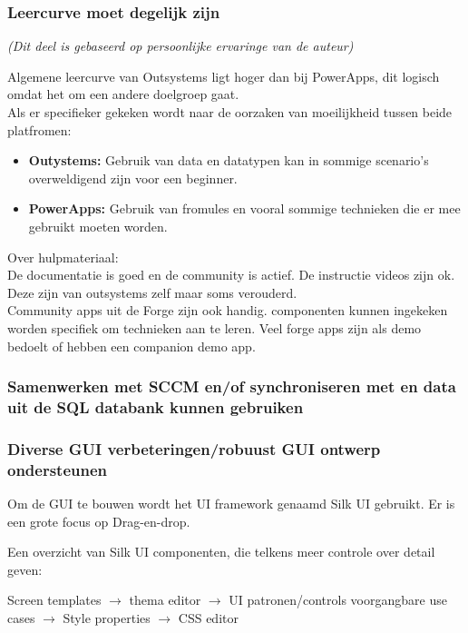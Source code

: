 \subsubsection{Leercurve moet degelijk zijn}

\textit{(Dit deel is gebaseerd op persoonlijke ervaringe van de auteur)}

Algemene leercurve van Outsystems ligt hoger dan bij PowerApps, dit logisch omdat het om een andere doelgroep gaat.\\
Als er specifieker gekeken wordt naar de oorzaken van moeilijkheid tussen beide platfromen:
\begin{itemize}
    \item \textbf{Outystems:} Gebruik van data en datatypen kan in sommige scenario's overweldigend zijn voor een beginner.
    \item \textbf{PowerApps:} Gebruik van fromules en vooral sommige technieken die er mee gebruikt moeten worden.
\end{itemize}

Over hulpmateriaal:\\
De documentatie is goed en de community is actief. De instructie videos zijn ok. Deze zijn van outsystems zelf maar soms verouderd.\\
Community apps uit de Forge zijn ook handig. componenten kunnen ingekeken worden specifiek om technieken aan te leren. Veel forge apps zijn als demo bedoelt of hebben een companion demo app.

\subsubsection{Samenwerken met SCCM en/of synchroniseren met en data uit de SQL databank kunnen gebruiken}


\subsubsection{Diverse GUI verbeteringen/robuust GUI ontwerp ondersteunen}

Om de GUI te bouwen wordt het UI framework genaamd Silk UI gebruikt. Er is een grote focus op Drag-en-drop.

Een overzicht van Silk UI componenten, die telkens meer controle over detail geven:

Screen templates $\rightarrow$ thema editor $\rightarrow$ UI patronen/controls voorgangbare use cases $\rightarrow$ Style properties $\rightarrow$ CSS editor

